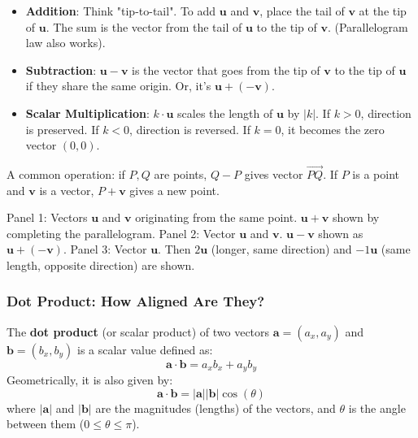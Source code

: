 \begin{intuition}
\label{intuition:A.1.1.vector_ops}
\begin{itemize}
    \item \textbf{Addition}: Think "tip-to-tail". To add $\mathbf{u}$ and $\mathbf{v}$, place the tail of $\mathbf{v}$ at the tip of $\mathbf{u}$. The sum is the vector from the tail of $\mathbf{u}$ to the tip of $\mathbf{v}$. (Parallelogram law also works).
    \item \textbf{Subtraction}: $\mathbf{u} - \mathbf{v}$ is the vector that goes from the tip of $\mathbf{v}$ to the tip of $\mathbf{u}$ if they share the same origin. Or, it's $\mathbf{u} + (-\mathbf{v})$.
    \item \textbf{Scalar Multiplication}: $k \cdot \mathbf{u}$ scales the length of $\mathbf{u}$ by $|k|$. If $k>0$, direction is preserved. If $k<0$, direction is reversed. If $k=0$, it becomes the zero vector $(0,0)$.
\end{itemize}
A common operation: if $P, Q$ are points, $Q-P$ gives vector $\vec{PQ}$. If $P$ is a point and $\mathbf{v}$ is a vector, $P+\mathbf{v}$ gives a new point.
\end{intuition}

\begin{visualexample}
\label{vis:A.1.1.vector_ops}
Panel 1: Vectors $\mathbf{u}$ and $\mathbf{v}$ originating from the same point. $\mathbf{u}+\mathbf{v}$ shown by completing the parallelogram.
Panel 2: Vector $\mathbf{u}$ and $\mathbf{v}$. $\mathbf{u}-\mathbf{v}$ shown as $\mathbf{u} + (-\mathbf{v})$.
Panel 3: Vector $\mathbf{u}$. Then $2\mathbf{u}$ (longer, same direction) and $-1\mathbf{u}$ (same length, opposite direction) are shown.
\end{visualexample}

\subsubsection{Dot Product: How Aligned Are They?}
\label{sssec:A.1.1.3}

\begin{definition}
\label{def:A.1.1.dot_product}
The \textbf{dot product} (or scalar product) of two vectors $\mathbf{a}=(a_x, a_y)$ and $\mathbf{b}=(b_x, b_y)$ is a scalar value defined as:
$$ \mathbf{a} \cdot \mathbf{b} = a_x b_x + a_y b_y $$
Geometrically, it is also given by:
$$ \mathbf{a} \cdot \mathbf{b} = |\mathbf{a}| |\mathbf{b}| \cos(\theta) $$
where $|\mathbf{a}|$ and $|\mathbf{b}|$ are the magnitudes (lengths) of the vectors, and $\theta$ is the angle between them ($0 \le \theta \le \pi$).
\end{definition}

